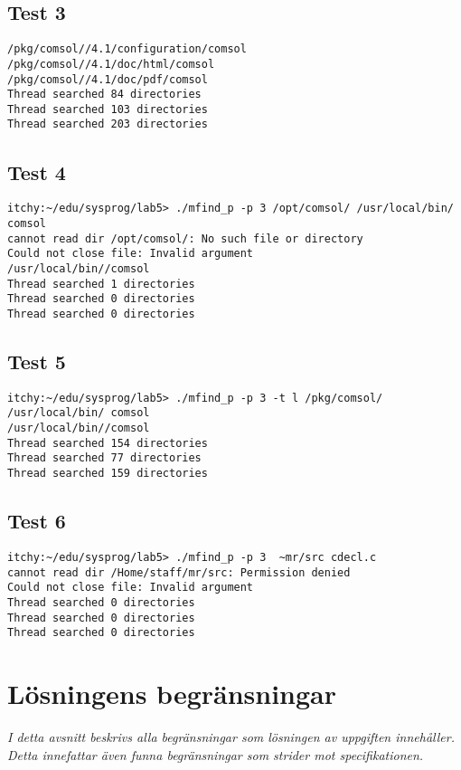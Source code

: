 \documentclass[11pt, titlepage, oneside, a4paper]{article}
\newcommand{\Section}[1]{\section{#1}\vspace{-8pt}}
\begin{document}
		 
		\subsection{Test 3}
		\begin{verbatim} 
/pkg/comsol//4.1/configuration/comsol
/pkg/comsol//4.1/doc/html/comsol
/pkg/comsol//4.1/doc/pdf/comsol
Thread searched 84 directories
Thread searched 103 directories
Thread searched 203 directories
		 \end{verbatim}
		 
		\subsection{Test 4}
		\begin{verbatim} 
itchy:~/edu/sysprog/lab5> ./mfind_p -p 3 /opt/comsol/ /usr/local/bin/ comsol
cannot read dir /opt/comsol/: No such file or directory
Could not close file: Invalid argument
/usr/local/bin//comsol
Thread searched 1 directories
Thread searched 0 directories
Thread searched 0 directories
		 \end{verbatim}

		 \subsection{Test 5}
		\begin{verbatim} 
itchy:~/edu/sysprog/lab5> ./mfind_p -p 3 -t l /pkg/comsol/ /usr/local/bin/ comsol
/usr/local/bin//comsol
Thread searched 154 directories
Thread searched 77 directories
Thread searched 159 directories
		 \end{verbatim}

		 \subsection{Test 6}
		\begin{verbatim} 
itchy:~/edu/sysprog/lab5> ./mfind_p -p 3  ~mr/src cdecl.c
cannot read dir /Home/staff/mr/src: Permission denied
Could not close file: Invalid argument
Thread searched 0 directories
Thread searched 0 directories
Thread searched 0 directories
		 \end{verbatim}
		 
	\Section{Lösningens begränsningar}
		\emph{I detta avsnitt beskrivs alla begränsningar som lösningen av
			uppgiften innehåller. Detta innefattar även funna begränsningar
			som strider mot specifikationen.}
			
\end{document}
